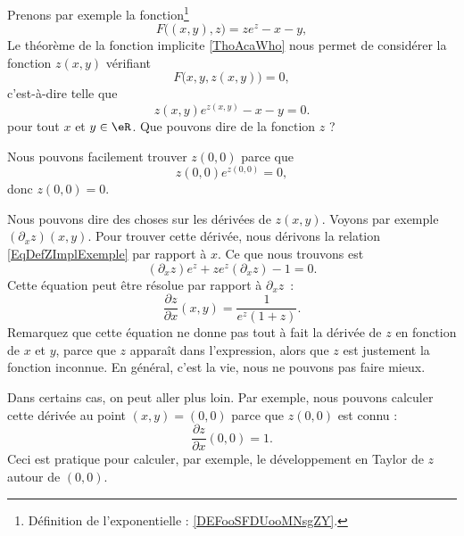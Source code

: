 \begin{example} \label{EXooTLNAooCJHPnq}
	Prenons par exemple la fonction\footnote{Définition de l'exponentielle : \ref{DEFooSFDUooMNsgZY}.}
	\begin{equation}
		F\big( (x,y),z \big)=ze^z-x-y,
	\end{equation}
	Le théorème de la fonction implicite \ref{ThoAcaWho} nous permet de considérer la fonction \( z(x,y)\) vérifiant
	\begin{equation}
		F\big( x,y,z(x,y) \big)=0,
	\end{equation}
	c'est-à-dire telle que
	\begin{equation}        \label{EqDefZImplExemple}
		z(x,y) e^{z(x,y)}-x-y=0.
	\end{equation}
	pour tout \( x\) et \( y\in\eR\). Que pouvons dire de la fonction \( z\) ?

	Nous pouvons facilement trouver \( z(0,0)\) parce que
	\begin{equation}
		z(0,0) e^{z(0,0)}=0,
	\end{equation}
	donc \( z(0,0)=0\).

	Nous pouvons dire des choses sur les dérivées de \( z(x,y)\). Voyons par exemple \( (\partial_xz)(x,y)\). Pour trouver cette dérivée, nous dérivons la relation \eqref{EqDefZImplExemple} par rapport à \( x\). Ce que nous trouvons est
	\begin{equation}
		(\partial_xz)e^z+ze^z(\partial_xz)-1=0.
	\end{equation}
	Cette équation peut être résolue par rapport à \( \partial_xz\)~:
	\begin{equation}
		\frac{ \partial z }{ \partial x }(x,y)=\frac{1}{ e^z(1+z) }.
	\end{equation}
	Remarquez que cette équation ne donne pas tout à fait la dérivée de \( z\) en fonction de \( x\) et \( y\), parce que \( z\) apparaît dans l'expression, alors que \( z\) est justement la fonction inconnue. En général, c'est la vie, nous ne pouvons pas faire mieux.

	Dans certains cas, on peut aller plus loin. Par exemple, nous pouvons calculer cette dérivée au point \( (x,y)=(0,0)\) parce que \( z(0,0)\) est connu :
	\begin{equation}
		\frac{ \partial z }{ \partial x }(0,0)=1.
	\end{equation}
	Ceci est pratique pour calculer, par exemple, le développement en Taylor de \( z\) autour de \( (0,0)\).
\end{example}

